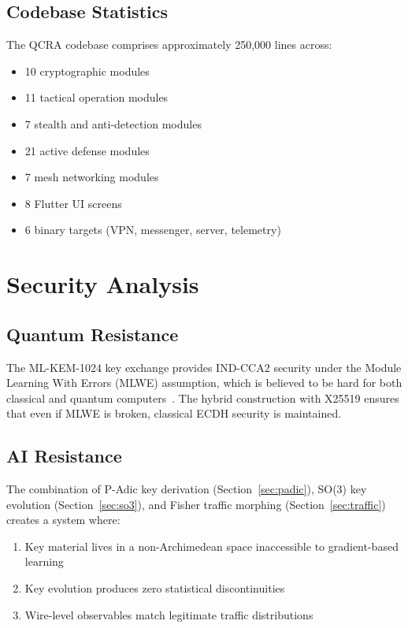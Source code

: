 \documentclass[11pt,a4paper]{article}
\begin{document}
\subsection{Codebase Statistics}

The QCRA codebase comprises approximately 250,000 lines across:
\begin{itemize}[nosep]
  \item 10 cryptographic modules
  \item 11 tactical operation modules
  \item 7 stealth and anti-detection modules
  \item 21 active defense modules
  \item 7 mesh networking modules
  \item 8 Flutter UI screens
  \item 6 binary targets (VPN, messenger, server, telemetry)
\end{itemize}

\section{Security Analysis}
\label{sec:security}

\subsection{Quantum Resistance}

The ML-KEM-1024 key exchange provides IND-CCA2 security under the
Module Learning With Errors (MLWE) assumption, which is believed to
be hard for both classical and quantum computers~\cite{nist2024fips203}.
The hybrid construction with X25519 ensures that even if MLWE is
broken, classical ECDH security is maintained.

\subsection{AI Resistance}

The combination of P-Adic key derivation (Section~\ref{sec:padic}),
SO(3) key evolution (Section~\ref{sec:so3}), and Fisher traffic
morphing (Section~\ref{sec:traffic}) creates a system where:
\begin{enumerate}[nosep]
  \item Key material lives in a non-Archimedean space inaccessible
    to gradient-based learning
  \item Key evolution produces zero statistical discontinuities
  \item Wire-level observables match legitimate traffic distributions
\end{enumerate}
\end{document}
